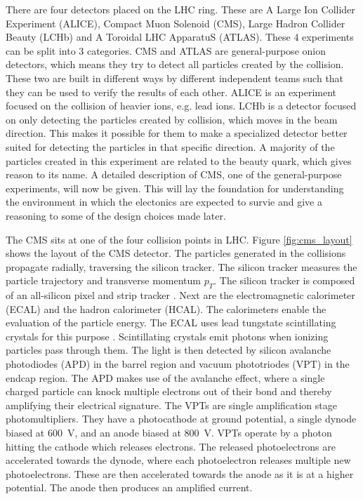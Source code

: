 There are four detectors placed on the LHC ring. These are A Large Ion Collider Experiment (ALICE), Compact Muon Solenoid (CMS), Large Hadron Collider Beauty (LCHb) and A Toroidal LHC ApparatuS (ATLAS). These 4 experiments can be split into 3 categories. CMS and ATLAS are general-purpose onion detectors, which means they try to detect all particles created by the collision. These two are built in different ways by different independent teams such that they can be used to verify the results of each other. ALICE is an experiment focused on the collision of heavier ions, e.g. lead ions. LCHb is a detector focused on only detecting the particles created by collision, which moves in the beam direction. This makes it possible for them to make a specialized detector better suited for detecting the particles in that specific direction. A majority of the particles created in this experiment are related to the beauty quark, which gives reason to its name. A detailed description of CMS, one of the general-purpose experiments, will now be given. This will lay the foundation for understanding the environment in which the electonics are expected to survie and give a reasoning to some of the design choices made later.

The CMS sits at one of the four collision points in LHC. Figure \ref{fig:cms_layout} shows the layout of the CMS detector. The particles generated in the collisions propagate radially, traversing the silicon tracker. The silicon tracker measures the particle trajectory and transverse momentum $p_T$. The silicon tracker is composed of an all-silicon pixel and strip tracker \cite{collaboration2008cms}. Next are the electromagnetic calorimeter (ECAL) and the hadron calorimeter (HCAL). The calorimeters enable the evaluation of the particle energy. The ECAL uses lead tungstate scintillating crystals for this purpose \cite{collaboration2008cms}. Scintillating crystals emit photons when ionizing particles pass through them. The light is then detected by silicon avalanche photodiodes (APD) in the barrel region and vacuum phototriodes (VPT) in the endcap region. The APD makes use of the avalanche effect, where a single charged particle can knock multiple electrons out of their bond and thereby amplifying their electrical signature. The VPTs are single amplification stage photomultipliers. They have a photocathode at ground potential, a single dynode biased at \SI{+600}{V}, and an anode biased at \SI{+800}{V}. VPTs operate by a photon hitting the cathode which releases electrons. The released photoelectrons are accelerated towards the dynode, where each photoelectron releases multiple new photoelectrons. These are then accelerated towards the anode as it is at a higher potential. The anode then produces an amplified current.     


